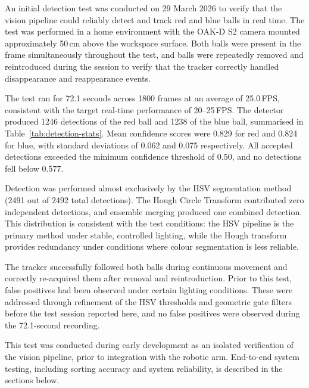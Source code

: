 
An initial detection test was conducted on 29 March 2026 to verify that the vision
pipeline could reliably detect and track red and blue balls in real time. The test
was performed in a home environment with the OAK-D S2 camera mounted
approximately 50\,cm above the workspace surface. Both balls were present in the
frame simultaneously throughout the test, and balls were repeatedly removed and
reintroduced during the session to verify that the tracker correctly handled
disappearance and reappearance events.

The test ran for 72.1 seconds across 1800 frames at an average of 25.0\,FPS,
consistent with the target real-time performance of 20--25\,FPS. The detector
produced 1246 detections of the red ball and 1238 of the blue ball, summarised in
Table~\ref{tab:detection-stats}. Mean confidence scores were 0.829 for red and
0.824 for blue, with standard deviations of 0.062 and 0.075 respectively. All
accepted detections exceeded the minimum confidence threshold of 0.50, and no
detections fell below 0.577.

Detection was performed almost exclusively by the HSV segmentation method (2491
out of 2492 total detections). The Hough Circle Transform contributed zero
independent detections, and ensemble merging produced one combined detection.
This distribution is consistent with the test conditions: the HSV pipeline is the
primary method under stable, controlled lighting, while the Hough transform
provides redundancy under conditions where colour segmentation is less reliable.

The tracker successfully followed both balls during continuous movement and
correctly re-acquired them after removal and reintroduction. Prior to this test,
false positives had been observed under certain lighting conditions. These were
addressed through refinement of the HSV thresholds and geometric gate filters
before the test session reported here, and no false positives were observed during
the 72.1-second recording.

This test was conducted during early development as an isolated verification of
the vision pipeline, prior to integration with the robotic arm. End-to-end
system testing, including sorting accuracy and system reliability, is described
in the sections below.


